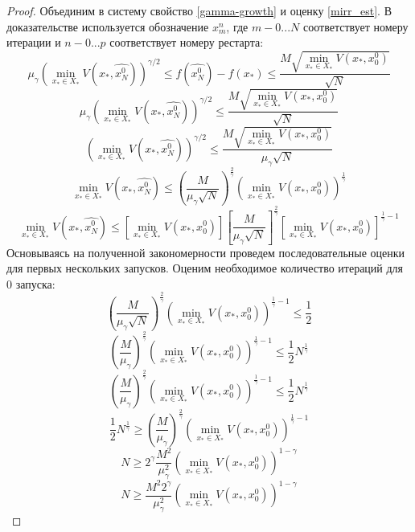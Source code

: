     \begin{proof}
       Объединим в систему свойство \eqref{gamma-growth} и оценку \eqref{mirr_est}. В доказательстве используется обозначение $x_m^n$, где $m - 0...N$ соответствует номеру итерации и $n - 0...p$ соответствует номеру рестарта: 
       $$
           \mu_{\gamma}\left(\min\limits_{x_* \in X_*}{V(x_*, \widehat{x_N^0})}\right)^{\gamma/2} \leq f(\widehat{x_N^0}) - f(x_*) \leq \frac{M\sqrt{\min\limits_{x_* \in X_*}{V(x_*, x_0^0)}}}{\sqrt{N}}
       $$
       $$
           \mu_{\gamma}\left(\min\limits_{x_* \in X_*}{V(x_*, \widehat{x_N^0})}\right)^{\gamma/2} \leq \frac{M\sqrt{\min\limits_{x_* \in X_*}{V(x_*, x_0^0)}}}{\sqrt{N}}
       $$
       $$
           \left(\min\limits_{x_* \in X_*}{V(x_*, \widehat{x_N^0})}\right)^{\gamma/2} \leq \frac{M\sqrt{\min\limits_{x_* \in X_*}{V(x_*, x_0^0)}}}{\mu_{\gamma}\sqrt{N}}
       $$
       $$
           \min\limits_{x_* \in X_*}{V(x_*, \widehat{x_N^0})} \leq \left(\frac{M}{\mu_{\gamma}\sqrt{N}}\right)^{\frac{2}{\gamma}} \left(\min\limits_{x_* \in X_*}{V(x_*, x_0^0)}\right)^{\frac{1}{\gamma}}
       $$
       $$
           \min\limits_{x_* \in X_*}{V(x_*, \widehat{x_N^0})} \leq \left[\min\limits_{x_* \in X_*}{V(x_*, x_0^0)} \right] \left[\frac{M}{\mu_{\gamma}\sqrt{N}}\right]^{\frac{2}{\gamma}} \left[\min\limits_{x_* \in X_*}{V(x_*, x_0^0)}\right]^{\frac{1}{\gamma} - 1}
       $$
       Основываясь на полученной закономерности проведем последовательные оценки для первых нескольких запусков. Оценим необходимое количество итераций для 0 запуска:
       $$
           \left(\frac{M}{\mu_{\gamma}\sqrt{N}}\right)^{\frac{2}{\gamma}} \left(\min\limits_{x_* \in X_*}{V(x_*, x_0^0)}\right)^{\frac{1}{\gamma} - 1} \leq \frac{1}{2} 
       $$
       $$
           \left(\frac{M}{\mu_{\gamma}}\right)^{\frac{2}{\gamma}} \left(\min\limits_{x_* \in X_*}{V(x_*, x_0^0)}\right)^{\frac{1}{\gamma} - 1} \leq \frac{1}{2} N^{\frac{1}{\gamma}} 
       $$
       $$
           \left(\frac{M}{\mu_{\gamma}}\right)^{\frac{2}{\gamma}} \left(\min\limits_{x_* \in X_*}{V(x_*, x_0^0)}\right)^{\frac{1}{\gamma} - 1} \leq \frac{1}{2} N^{\frac{1}{\gamma}} 
       $$
       $$
           \frac{1}{2} N^{\frac{1}{\gamma}} \geq \left(\frac{M}{\mu_{\gamma}}\right)^{\frac{2}{\gamma}} \left(\min\limits_{x_* \in X_*}{V(x_*, x_0^0)}\right)^{\frac{1}{\gamma} - 1}  
       $$
       $$
           N \geq 2 ^ {\gamma} \frac{M^2}{\mu_{\gamma}^2} \left(\min\limits_{x_* \in X_*}{V(x_*, x_0^0)}\right)^{1 - \gamma}  
       $$
       $$
           N \geq \frac{M^2 2^{\gamma}}{\mu_{\gamma}^2} \left(\min\limits_{x_* \in X_*}{V(x_*, x_0^0)}\right)^{1 - \gamma}  
$$
\end{proof}
